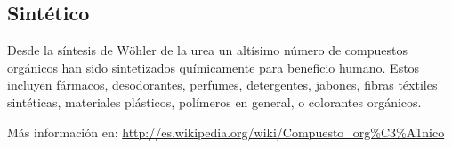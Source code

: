 \documentclass[12pt,letterpaper]{article}
\begin{document}
\subsection{Sintético}

Desde la síntesis de Wöhler de la urea un altísimo número de compuestos orgánicos han sido sintetizados químicamente para beneficio humano. Estos incluyen fármacos, desodorantes, perfumes, detergentes, jabones, fibras téxtiles sintéticas, materiales plásticos, polímeros en general, o colorantes orgánicos.

Más información en: \url{http://es.wikipedia.org/wiki/Compuesto_org\%C3\%A1nico}
\end{document}
